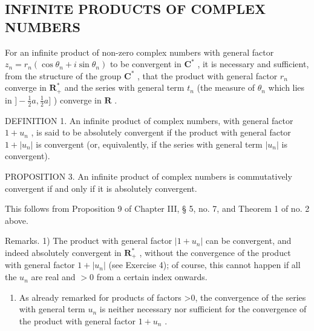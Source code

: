 \subsection{INFINITE PRODUCTS OF COMPLEX NUMBERS}

For an infinite product of non-zero complex numbers with general factor \(z_{n} = r_{n}(\cos \theta_{n} + i\sin \theta_{n})\) to be convergent in \(\mathbf{C}^{*}\) , it is necessary and sufficient, from the structure of the group \(\mathbf{C}^{*}\) , that the product with general factor \(r_{n}\) converge in \(\mathbf{R}_{+}^{*}\) and the series with general term \(t_{n}\) (the measure of \(\theta_{n}\) which lies in \(] - \frac{1}{2} a, \frac{1}{2} a]\) ) converge in \(\mathbf{R}\) .

DEFINITION 1. An infinite product of complex numbers, with general factor \(1 + u_{n}\) , is said to be absolutely convergent if the product with general factor \(1 + |u_{n}|\) is convergent (or, equivalently, if the series with general term \(|u_{n}|\) is convergent).

PROPOSITION 3. An infinite product of complex numbers is commutatively convergent if and only if it is absolutely convergent.

This follows from Proposition 9 of Chapter III, § 5, no. 7, and Theorem 1 of no. 2 above.

Remarks. 1) The product with general factor \(|1 + u_n|\) can be convergent, and indeed absolutely convergent in \(\mathbf{R}_+^*\) , without the convergence of the product with general factor \(1 + |u_n|\) (see Exercise 4); of course, this cannot happen if all the \(u_n\) are real and \(>0\) from a certain index onwards.

\begin{enumerate}
\def\labelenumi{\arabic{enumi})}
\setcounter{enumi}{1}
\tightlist
\item
  As already remarked for products of factors \textgreater0, the convergence of the series with general term \(u_{n}\) is neither necessary nor sufficient for the convergence of the product with general factor \(1 + u_{n}\) .
\end{enumerate}

